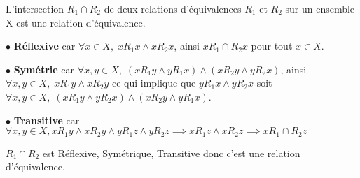 \documentclass[a4paper, 12pt]{article}
\begin{document}
\begin{proposition}
    L'intersection $R_1 \cap R_2$ de deux relations d'équivalences $R_1$ et $R_2$ sur un ensemble X est une relation d'équivalence.
\end{proposition}

\begin{demonstration}
    \item $\bullet$ \textbf{Réflexive} car $\forall x \in X, \; x R_1 x \land x R_2 x$, ainsi $x R_1 \cap R_2 x$ pour tout $x \in X$.
    \item $\bullet$ \textbf{Symétrie} car $\forall x, y \in X, \; (x R_1 y \land y R_1 x) \land (x R_2 y \land y R_2 x)$, ainsi $\forall x, y \in X, \; x R_1 y \land x R_2 y$ ce qui implique que $y R_1 x \land y R_2 x$
    soit $\forall x, y \in X, \; (x R_1 y \land y R_2 x) \land (x R_2 y \land y R_1 x)$.
    \item $\bullet$ \textbf{Transitive} car $\forall x, y \in X, x R_1 y \land x R_2 y \land y R_1 z \land y R_2 z \implies xR_1z \land xR_2z \implies x R_1 \cap R_2 z$
    
    \begin{rdem}
        $R_1 \cap R_2$ est Réflexive, Symétrique, Transitive donc c'est une relation d'équivalence.
    \end{rdem}
\end{demonstration}
\end{document}

